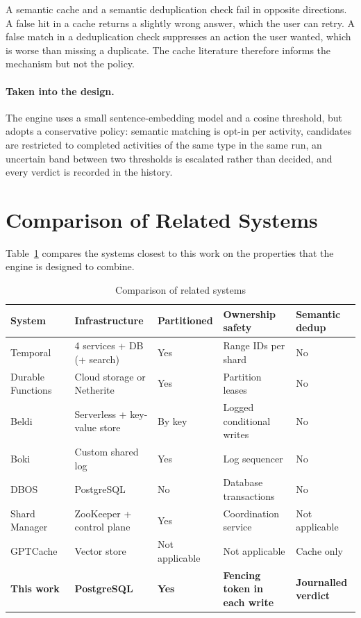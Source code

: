 A semantic cache and a semantic deduplication check fail in opposite
directions. A false hit in a cache returns a slightly wrong answer, which the
user can retry. A false match in a deduplication check suppresses an action
the user wanted, which is worse than missing a duplicate. The cache literature
therefore informs the mechanism but not the policy.

\paragraph{Taken into the design.} The engine uses a small sentence-embedding
model and a cosine threshold, but adopts a conservative policy: semantic
matching is opt-in per activity, candidates are restricted to completed
activities of the same type in the same run, an uncertain band between two
thresholds is escalated rather than decided, and every verdict is recorded in
the history.

\section{Comparison of Related Systems}

Table~\ref{tab:litcompare} compares the systems closest to this work on the
properties that the engine is designed to combine.

\begin{table}[htbp]
  \centering
  \caption{Comparison of related systems}
  \label{tab:litcompare}
  \small
  \begin{tabular}{|p{1.25in}|p{0.95in}|p{0.85in}|p{0.95in}|p{0.85in}|}
    \hline
    \textbf{System} & \textbf{Infrastructure} & \textbf{Partitioned} &
      \textbf{Ownership safety} & \textbf{Semantic dedup} \\
    \hline
    Temporal~\cite{temporaldocs} & 4 services + DB (+ search) & Yes &
      Range IDs per shard & No \\
    \hline
    Durable Functions~\cite{durablefunctions2021, netherite2022} & Cloud
      storage or Netherite & Yes & Partition leases & No \\
    \hline
    Beldi~\cite{beldi2020} & Serverless + key-value store & By key &
      Logged conditional writes & No \\
    \hline
    Boki~\cite{boki2021} & Custom shared log & Yes & Log sequencer & No \\
    \hline
    DBOS~\cite{dbos2022} & PostgreSQL & No & Database transactions & No \\
    \hline
    Shard Manager~\cite{shardmanager2021} & ZooKeeper + control plane & Yes &
      Coordination service & Not applicable \\
    \hline
    GPTCache~\cite{gptcache2023} & Vector store & Not applicable &
      Not applicable & Cache only \\
    \hline
    \textbf{This work} & \textbf{PostgreSQL} & \textbf{Yes} &
      \textbf{Fencing token in each write} & \textbf{Journalled verdict} \\
    \hline
  \end{tabular}
\end{table}

